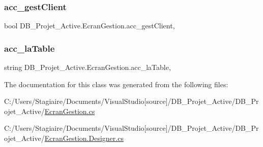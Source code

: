 \subsubsection{\texorpdfstring{acc\_gestClient}{acc\_gestClient}}
{\footnotesize\ttfamily bool D\+B\+\_\+\+Projet\+\_\+\+Active.\+Ecran\+Gestion.\+acc\+\_\+gest\+Client\hspace{0.3cm}{\ttfamily [get]}, {\ttfamily [set]}}

\mbox{\label{class_d_b___projet___active_1_1_ecran_gestion_a84691d002fb4a2cc3be13bd6b6670246}} 
\subsubsection{\texorpdfstring{acc\_laTable}{acc\_laTable}}
{\footnotesize\ttfamily string D\+B\+\_\+\+Projet\+\_\+\+Active.\+Ecran\+Gestion.\+acc\+\_\+la\+Table\hspace{0.3cm}{\ttfamily [get]}, {\ttfamily [set]}}



The documentation for this class was generated from the following files\+:\begin{DoxyCompactItemize}
\item 
C\+:/\+Users/\+Stagiaire/\+Documents/\+Visual\+Studio\mbox{[}source\mbox{]}/\+D\+B\+\_\+\+Projet\+\_\+\+Active/\+D\+B\+\_\+\+Projet\+\_\+\+Active/\mbox{\hyperlink{_ecran_gestion_8cs}{Ecran\+Gestion.\+cs}}\item 
C\+:/\+Users/\+Stagiaire/\+Documents/\+Visual\+Studio\mbox{[}source\mbox{]}/\+D\+B\+\_\+\+Projet\+\_\+\+Active/\+D\+B\+\_\+\+Projet\+\_\+\+Active/\mbox{\hyperlink{_ecran_gestion_8_designer_8cs}{Ecran\+Gestion.\+Designer.\+cs}}\end{DoxyCompactItemize}
